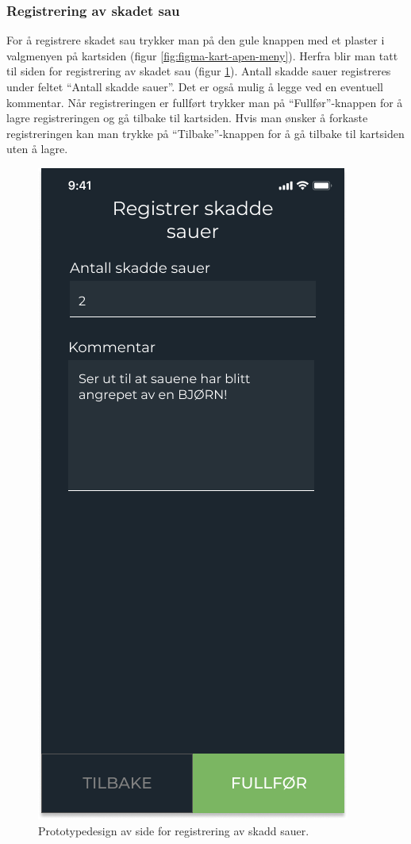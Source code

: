 \subsubsection{Registrering av skadet sau}
For å registrere skadet sau trykker man på den gule knappen med et plaster i valgmenyen på kartsiden (figur \ref{fig:figma-kart-apen-meny}). Herfra blir man tatt til siden for registrering av skadet sau (figur \ref{fig:figma-registrer-skadd-sau}). Antall skadde sauer registreres under feltet \enquote{Antall skadde sauer}. Det er også mulig å legge ved en eventuell kommentar. Når registreringen er fullført trykker man på \enquote{Fullfør}-knappen for å lagre registreringen og gå tilbake til kartsiden. Hvis man ønsker å forkaste registreringen kan man trykke på \enquote{Tilbake}-knappen for å gå tilbake til kartsiden uten å lagre.
\begin{figure}[H]
\centering
\captionsetup{width=.8\linewidth}
\includegraphics[scale=0.4  ]{Figurer/Figma/Frame 2.2a.1 - Registrer-skadde-sauer.png}
\caption{Prototypedesign av side for registrering av skadd sauer.}
\label{fig:figma-registrer-skadd-sau}
\end{figure}

